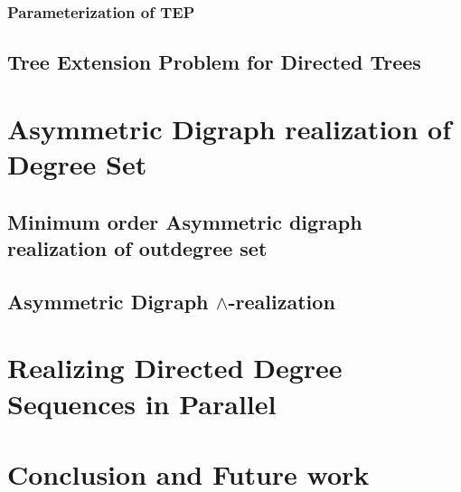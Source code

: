 \documentclass[11pt]{article}
\begin{document}
         \subsubsection{Parameterization of TEP}
      \subsection{Tree Extension Problem for Directed Trees}



\section{Asymmetric Digraph realization of Degree Set}
  
      \subsection{Minimum order Asymmetric digraph realization of outdegree set}
      \subsection{Asymmetric Digraph $\land$-realization}

\section{Realizing Directed Degree Sequences in Parallel}

\section{Conclusion and Future work}
    


%
%

\end{document}
